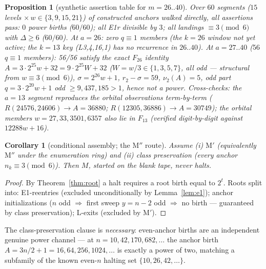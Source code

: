 \documentclass[11pt]{amsart}
\newtheorem{proposition}[theorem]{Proposition}
\newtheorem{corollary}[theorem]{Corollary}
\theoremstyle{definition}
\newcommand{\vtwo}[1]{\nu_2(#1)}
\begin{document}
\begin{proposition}[synthetic assertion table for $m=26..40$]\label{prop:m2640}
Over $60$ segments ($15$ levels $\times\,w\in\{3,9,15,21\}$) of constructed
anchors walked directly, all assertions pass: $0$ power births ($60/60$);
all E1r divisible by $3$; all landings $\equiv3\pmod6$ with $\Delta\ge6$
($60/60$). At $a=26$: \emph{zero} $q\equiv1$ members (the $k{=}26$ window
not yet active; the $k{=}13$ key (L3,4,16,1) has no recurrence in $26..40$).
At $a=27..40$ ($56$ $q\equiv1$ members): \emph{56/56 satisfy the exact
$F_{26}$ identity} $A=3\cdot2^{25}w+32=9\cdot2^{25}W+32$ ($W=w/3\in
\{1,3,5,7\}$, all odd --- structural from $w\equiv3\pmod6$),
$\sigma=2^{26}w+1$, $r_2-\sigma=59$, $\vtwo{A}=5$, odd part
$q=3\cdot2^{20}w+1$ odd $\ge9{,}437{,}185>1$, hence not a power.
Cross-checks: the $a=13$ segment reproduces the orbital observations
term-by-term ($R(24576,24606)\to A=36880$; $R(12305,36886)\to A=30749$); the
orbital members $w=27,33,3501,6357$ also lie in $F_{13}$ (verified
digit-by-digit against $12288w+16$).
\end{proposition}

\begin{corollary}[conditional assembly; the $\mathrm{M''}$ route]\label{cor:assembly2}
Assume (i) $\mathrm{M'}$ (equivalently $\mathrm{M''}$ under the enumeration
ring) and (ii) class preservation (every anchor $n_k\equiv3\pmod 6$). Then
$M$, started on the blank tape, never halts.
\end{corollary}
\begin{proof}
By Theorem~\ref{thm:root} a halt requires a root birth equal to $2^{t}$.
Roots split into: E1-reentries (excluded unconditionally by
Lemma~\ref{lem:e1}); anchor initializations ($n$ odd $\Rightarrow$ first
sweep $y=n-2$ odd $\Rightarrow$ no birth --- guaranteed by class
preservation); L-exits (excluded by $\mathrm{M'}$).
\end{proof}
The class-preservation clause is \emph{necessary}: even-anchor births are an
independent genuine power channel --- at $n=10,42,170,682,\dots$ the anchor
birth $A=3n/2+1=16,64,256,1024,\dots$ is exactly a power of two, matching a
subfamily of the known even-$n$ halting set $\{10,26,42,\dots\}$.
\end{document}
